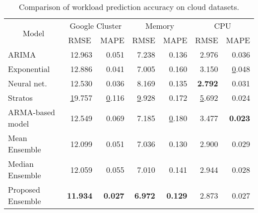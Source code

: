 \begin{table}[]
\centering
\caption{Comparison of workload prediction accuracy on cloud datasets.}
\label{prediction_cloud}
\begin{tabular}{|l|r|r|r|r|r|r|}
\hline
\multicolumn{1}{|c|}{\multirow{2}{*}{Model}} & \multicolumn{2}{c|}{Google Cluster}                   & \multicolumn{2}{c|}{Memory}                              & \multicolumn{2}{c|}{CPU}                              \\ \cline{2-7} 
\multicolumn{1}{|c|}{}                       & \multicolumn{1}{c|}{RMSE} & \multicolumn{1}{c|}{MAPE} & \multicolumn{1}{c|}{RMSE} & \multicolumn{1}{c|}{MAPE} & \multicolumn{1}{c|}{RMSE} & \multicolumn{1}{c|}{MAPE} \\ \hline
ARIMA                                        & 12.963                    & 0.051                     & 7.238                     & 0.136                     & 2.976                     & 0.036                     \\ \hline
Exponential                                  & 12.886                    & 0.041                     & 7.005                     & 0.160                     & 3.150                     & {\ul 0.048}               \\ \hline
Neural net.                                  & 12.530                    & 0.036                     & 8.169                     & 0.135                     & \textbf{2.792}            & 0.031                     \\ \hline
Stratos                                      & {\ul 19.757}              & {\ul 0.116}               & {\ul 9.928}               & 0.172               & {\ul 5.692}               & 0.024            \\ \hline

ARMA-based model                                      & 12.549              & 0.069               & 7.185               & {\ul 0.180}               & 3.477               & \textbf{0.023}            \\ \hline

Mean Ensemble                                      & 12.099              & 0.051               & 7.036               & 0.130               & 2.900               & 0.029            \\ \hline
Median Ensemble                                      &  12.059              & 0.055               &  7.010               & 0.141               & 2.944               & 0.028            \\ \hline

Proposed Ensemble                                     & \textbf{11.934}           & \textbf{0.027}            & \textbf{6.972}            & \textbf{0.129}            & 2.873                     & 0.027                     \\ \hline
\end{tabular}
\end{table}